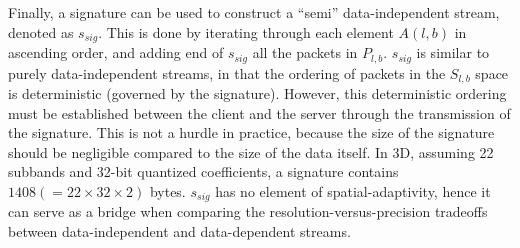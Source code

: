 Finally, a signature can be used to construct a ``semi'' data-independent stream, denoted as
$s_{sig}$. This is done by iterating through each element $A(l,b)$ in ascending order, and adding
end of $s_{sig}$ all the packets in $P_{l,b}$. $s_{sig}$ is similar to purely data-independent
streams, in that the ordering of packets in the $S_{l,b}$ space is deterministic (governed by the
signature). However, this deterministic ordering must be established between the client and the
server through the transmission of the signature. This is not a hurdle in practice, because the size
of the signature should be negligible compared to the size of the data itself. In 3D, assuming 22
subbands and 32-bit quantized coefficients, a signature contains $1408 (=22\times 32\times 2)$
bytes. $s_{sig}$ has no element of spatial-adaptivity, hence it can serve as a bridge when comparing
the resolution-versus-precision tradeoffs between data-independent and data-dependent streams.
